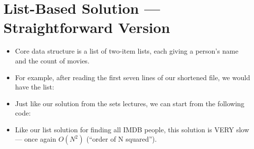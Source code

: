 \documentclass[letterpaper,10pt,english]{sphinxmanual}
\begin{document}
\section{List-Based Solution — Straightforward Version}
\label{\detokenize{lecture_notes/lec16_dictionaries1:list-based-solution-straightforward-version}}\begin{itemize}
\item {} 
Core data structure is a list of two-item lists, each giving a
person’s name and the count of movies.

\item {} 
For example, after reading the first seven lines of our shortened
 file, we would have the list:

\begin{sphinxVerbatim}[commandchars=\\\{\}]
\PYG{p}{[}\PYG{p}{[} \PYG{p}{]} \PYG{p}{[} \PYG{p}{]}
  \PYG{p}{[} \PYG{p}{]} \PYG{p}{[} \PYG{p}{]}\PYG{p}{]}
\end{sphinxVerbatim}

\item {} 
Just like our solution from the sets lectures, we can start from the
following code:

\begin{sphinxVerbatim}[commandchars=\\\{\}]
  
  \PYG{p}{[}\PYG{p}{]}
    
      
      \PYG{p}{[}\PYG{p}{]}
\end{sphinxVerbatim}

\item {} 
Like our list solution for finding all IMDB people, this solution is
VERY slow — once again \(O(N^2)\) (“order of N squared”).

\end{itemize}
\end{document}
